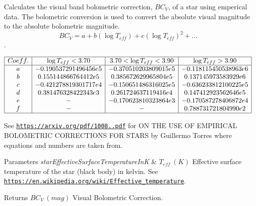Calculates the visual band bolometric correction, $BC_{V}$, of a star using emperical data. The bolometric conversion is used to convert the absolute visual magnitude to the absolute bolometric magnitude. \[ BC_{V}=a + b ( \log T_{eff}) + c ( \log T_{eff})^2 + ...\]. 

\[\begin{array}{|c|c|c|c|} \hline Coeff. & \log T_{eff} < 3.70 & 3.70 < \log T_{eff} < 3.90 & \log T_{eff} > 3.90 \\ \hline a & -0.190537291496456e5 & -0.370510203809015e5 & -0.118115450538963e6 \\ b & 0.155144866764412e5 & 0.385672629965804e5 & 0.137145973583929e6 \\ c & -0.421278819301717e4 & -0.150651486316025e5 & -0.636233812100225e5 \\ d & 0.381476328422343e3 & 0.261724637119416e4 & 0.147412923562646e5 \\ e & - & -0.170623810323864e3 & -0.170587278406872e4 \\ f & - & - & 0.788731721804990e2 \\ \hline \end{array}\]

See \href{https://arxiv.org/pdf/1008.3913.pdf}{\tt https\+://arxiv.\+org/pdf/1008..\+pdf} for ON T\+HE U\+SE OF E\+M\+P\+I\+R\+I\+C\+AL B\+O\+L\+O\+M\+E\+T\+R\+IC C\+O\+R\+R\+E\+C\+T\+I\+O\+NS F\+OR S\+T\+A\+RS by Guillermo Torres where equations and numbers are taken from.


\begin{DoxyParams}{Parameters}
{\em star\+Effective\+Surface\+Temperature\+InK} & $T_{eff}\ (K)$ Effective surface temperature of the star (black body) in kelvin. See \href{https://en.wikipedia.org/wiki/Effective_temperature}{\tt https\+://en.\+wikipedia.\+org/wiki/\+Effective\+\_\+temperature}. \\
\hline
\end{DoxyParams}
\begin{DoxyReturn}{Returns}
$BC_{V}\ (mag)$ Visual Bolometric Correction. 
\end{DoxyReturn}
